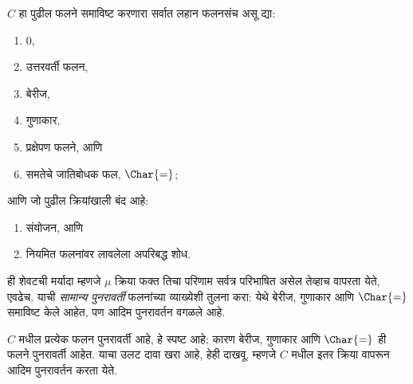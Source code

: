 \documentclass[../../../include/open-logic-section]{subfiles}
\begin{document}

$C$ हा पुढील फलने समाविष्ट करणारा सर्वात लहान फलनसंच असू द्या:
\begin{enumerate}
\item $0$,
\item उत्तरवर्ती फलन,
\item बेरीज,
\item गुणाकार,
\item प्रक्षेपण फलने, आणि
\item समतेचे जातिबोधक फल, $\Char{=}$;
\end{enumerate}
आणि जो पुढील क्रियांखाली बंद आहे:
\begin{enumerate}
\item संयोजन, आणि
\item नियमित फलनांवर लावलेला अपरिबद्ध शोध.
\end{enumerate}
ही शेवटची मर्यादा म्हणजे $\mu$ क्रिया फक्त तिचा परिणाम
सर्वत्र परिभाषित असेल तेव्हाच वापरता येते, एवढेच. याची
\emph{सामान्य पुनरावर्ती} फलनांच्या व्याख्येशी तुलना करा:
येथे बेरीज, गुणाकार आणि $\Char{=}$ समाविष्ट केले आहेत,
पण आदिम पुनरावर्तन वगळले आहे.

$C$ मधील प्रत्येक फलन पुनरावर्ती आहे, हे स्पष्ट आहे; कारण
बेरीज, गुणाकार आणि $\Char{=}$ ही फलने पुनरावर्ती आहेत.
याचा उलट दावा खरा आहे, हेही दाखवू. म्हणजे $C$ मधील
इतर क्रिया वापरून आदिम पुनरावर्तन करता येते.
\end{document}
